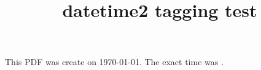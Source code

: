 \documentclass{article}
\title{datetime2 tagging test}
\begin{document}
This PDF was create on \today. The exact time was \DTMnow.
\end{document}
